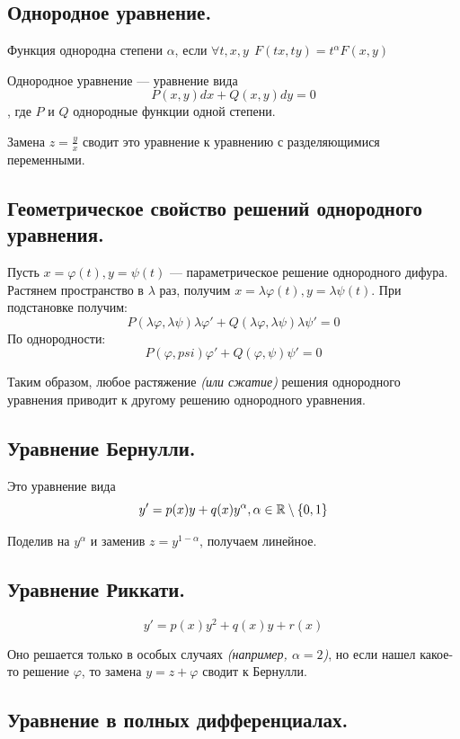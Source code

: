 \subsection*{Однородное уравнение.}

Функция однородна степени \(\alpha\), если \(\forall t,x,y \ \ F(tx, ty) = t^\alpha F(x, y)\)

Однородное уравнение --- уравнение вида
\[P(x, y)dx + Q(x, y)dy = 0\]
, где \(P\) и \(Q\) однородные функции одной степени.

Замена \(z = \frac{y}{x}\) сводит это уравнение к уравнению с разделяющимися переменными.

\subsection*{Геометрическое свойство решений однородного уравнения.}

Пусть \(x = \varphi(t), y = \psi(t)\) --- параметрическое решение однородного дифура. Растянем пространство в \(\lambda\) раз, получим \(x = \lambda \varphi(t), y = \lambda \psi(t)\). При подстановке получим:
\[P(\lambda\varphi, \lambda\psi) \lambda\varphi' + Q(\lambda\varphi, \lambda\psi)\lambda\psi' = 0\]
По однородности:
\[P(\varphi, psi) \varphi' + Q(\varphi, \psi)\psi' = 0\]

Таким образом, любое растяжение \textit{(или сжатие)} решения однородного уравнения приводит к другому решению однородного уравнения.

\subsection*{Уравнение Бернулли.}

Это уравнение вида
\[y' = p(x) y + q(x) y^\alpha, \alpha\in\mathbb{R}\setminus \{0,1\}\]

Поделив на \(y^\alpha\) и заменив \(z = y^{1 - \alpha}\), получаем линейное.

\subsection*{Уравнение Риккати.}

\[y' = p(x) y^2 + q(x)y + r(x)\]

Оно решается только в особых случаях \textit{(например, \(\alpha = 2\))}, но если нашел какое-то решение \(\varphi\), то замена \(y = z + \varphi\) сводит к Бернулли.

\subsection*{Уравнение в полных дифференциалах.}

